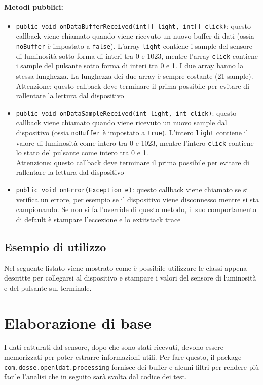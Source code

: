 \paragraph{Metodi pubblici:}\begin{itemize}
	\item \texttt{public void onDataBufferReceived(int[] light, int[] click){}}: questo callback viene chiamato quando viene ricevuto un nuovo buffer di dati (ossia \texttt{noBuffer} è impostato a \texttt{false}). L'array \texttt{light} contiene i sample del sensore di luminosità sotto forma di interi tra 0 e 1023, mentre l'array \texttt{click} contiene i sample del pulsante sotto forma di interi tra 0 e 1. I due array hanno la stessa lunghezza. La lunghezza dei due array è sempre costante (21 sample).\\
	Attenzione: questo callback deve terminare il prima possibile per evitare di rallentare la lettura dal dispositivo
	\item \texttt{public void onDataSampleReceived(int light, int click){}}: questo callback viene chiamato quando viene ricevuto un nuovo sample dal dispositivo (ossia \texttt{noBuffer} è impostato a \texttt{true}). L'intero \texttt{light} contiene il valore di luminosità come intero tra 0 e 1023, mentre l'intero \texttt{click} contiene lo stato del pulsante come intero tra 0 e 1.\\
	Attenzione: questo callback deve terminare il prima possibile per evitare di rallentare la lettura dal dispositivo
	\item \texttt{public void onError(Exception e)}: questo callback viene chiamato se si verifica un errore, per esempio se il dispositivo viene disconnesso mentre si sta campionando. Se non si fa l'override di questo metodo, il suo comportamento di default è stampare l'eccezione e lo 	extit{stack trace}
\end{itemize}

\subsection{Esempio di utilizzo}
Nel seguente listato viene mostrato come è possibile utilizzare le classi appena descritte per collegarsi al dispositivo e stampare i valori del sensore di luminosità e del pulsante sul terminale.


\section{Elaborazione di base}
I dati catturati dal sensore, dopo che sono stati ricevuti, devono essere memorizzati per poter estrarre informazioni utili. Per fare questo, il package \texttt{com.dosse.openldat.processing} fornisce dei buffer e alcuni filtri per rendere più facile l'analisi che in seguito sarà svolta dal codice dei test.

